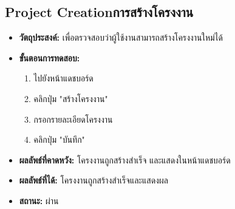 \subsection{\ifenglish Project Creation\else การสร้างโครงงาน\fi}
\begin{itemize}
  \item \textbf{วัตถุประสงค์:} เพื่อตรวจสอบว่าผู้ใช้งานสามารถสร้างโครงงานใหม่ได้
  \item \textbf{ขั้นตอนการทดสอบ:}
  \begin{enumerate}
    \item ไปยังหน้าแดชบอร์ด
    \item คลิกปุ่ม "สร้างโครงงาน"
    \item กรอกรายละเอียดโครงงาน
    \item คลิกปุ่ม "บันทึก"
  \end{enumerate}
  \item \textbf{ผลลัพธ์ที่คาดหวัง:} โครงงานถูกสร้างสำเร็จ และแสดงในหน้าแดชบอร์ด
  \item \textbf{ผลลัพธ์ที่ได้:} โครงงานถูกสร้างสำเร็จและแสดงผล
  \item \textbf{สถานะ:} ผ่าน
\end{itemize}
